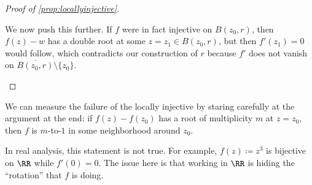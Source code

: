 \documentclass[../notes.tex]{subfiles}
\begin{document}
\begin{proof}[Proof of \autoref{prop:locallyinjective}]
\begin{itemize}
		We now push this further. If $f$ were in fact injective on $B(z_0,r)$, then $f(z)-w$ has a double root at some $z=z_1\in B(z_0,r)$, but then $f'(z_1)=0$ would follow, which contradicts our construction of $r$ because $f'$ does not vanish on $\overline{B(z_0,r)}\setminus\{z_0\}$.
		\qedhere
	\end{itemize}
\end{proof}
\begin{remark}
	We can measure the failure of the locally injective by staring carefully at the argument at the end: if $f(z)-f(z_0)$ has a root of multiplicity $m$ at $z=z_0$, then $f$ is $m$-to-$1$ in some neighborhood around $z_0$. 
\end{remark}
\begin{nex}
	In real analysis, this statement is not true. For example, $f(z)\coloneqq z^3$ is bijective on $\RR$ while $f'(0)=0$. The issue here is that working in $\RR$ is hiding the ``rotation'' that $f$ is doing.
\end{nex}
\end{document}
